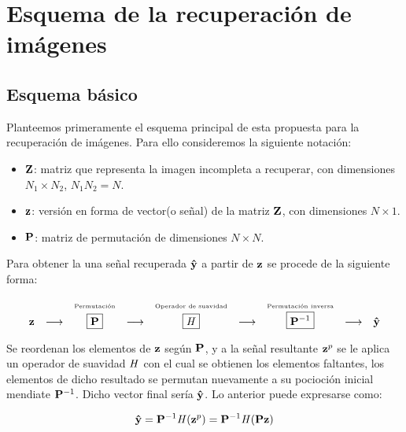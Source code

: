 \chapter{Esquema de la recuperaci\'on de im\'agenes}\label{chapter:SCHEME} %

\section{Esquema b\'asico}
Planteemos primeramente el esquema principal de esta propuesta para la recuperaci\'on de im\'agenes. Para ello consideremos la siguiente notaci\'on:

\begin{itemize}
	\item $\Z$: matriz que representa la imagen incompleta a recuperar, con dimensiones $N_1 \times N_2$, $N_1N_2 = N$.
	\item $\z$: versión en forma de vector(o señal) de la matriz $\Z$, con dimensiones $N \times 1$.
	\item $\P$: matriz de permutaci\'on de dimensiones $N \times N$.
\end{itemize}

Para obtener la una señal recuperada $\yhat$ a partir de $\z$ se procede de la siguiente forma:

\begin{equation}
	\begin{array}[t]{ccccccccc}
	& & \mbox{\tiny{Permutaci\'on}} & & \mbox{\tiny{Operador de suavidad}} & & \mbox{\tiny{Permutaci\'on inversa}} & &\\
	\z & \longrightarrow & \boxed{\P} & \longrightarrow & \boxed{\H} & \longrightarrow & \boxed{\P^{-1}} & \longrightarrow & \yhat \\
	\end{array}
	\label{basic:scheme}
\end{equation}

Se reordenan los elementos de $\z$ seg\'un $\P$, y a la señal resultante $\z^p$ se le aplica un operador de suavidad $\H$ con el cual se obtienen los elementos faltantes, los elementos de dicho resultado se permutan nuevamente a su pocioci\'on inicial mendiate $\P^{-1}$. Dicho vector final ser\'ia $\yhat$. Lo anterior puede expresarse como:

\begin{equation}
\yhat = \P^{-1}\H(\z^p) = \P^{-1}\H(\P\z)
\label{basic:formula}
\end{equation}

